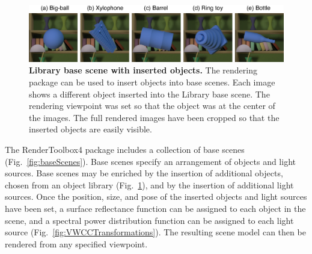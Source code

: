 \documentclass{jov}
\begin{document}
\begin{figure}
\centering
\includegraphics[width=\textwidth]{Figure3.eps}
\caption{{\bf Library base scene with inserted objects.} The rendering package can be used to insert objects into base scenes. Each image shows a different object inserted into the Library base scene. The rendering viewpoint was set so that the object was at the center of the images. The full rendered images have been cropped so that the inserted objects are easily visible.}\label{fig:libraryWithTarget}
\end{figure}

The RenderToolbox4 package includes a collection of base scenes (Fig.~\ref{fig:baseScenes}).
Base scenes specify an arrangement of objects and light sources.
Base scenes may be enriched by the insertion of additional objects, chosen from an object library (Fig.~\ref{fig:libraryWithTarget}), and by the insertion of additional light sources.
Once the position, size, and pose of the inserted objects and light sources have been set, 
a surface reflectance function can be assigned to each object in the scene, and a spectral power distribution function can be assigned to each light source (Fig.~\ref{fig:VWCCTransformations}). The resulting scene model can then be rendered from any specified viewpoint.
\end{document}
